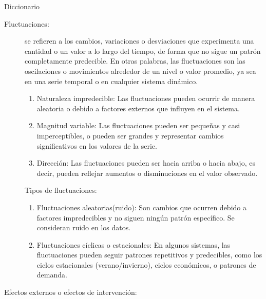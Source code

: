 \newpage
Diccionario
\begin{description}
    \item[Fluctuaciones: ] se refieren a los cambios, variaciones o desviaciones que experimenta 
    una cantidad o un valor a lo largo del tiempo, de forma que no sigue un patr\'on 
    completamente predecible. 
    En otras palabras, las fluctuaciones son las oscilaciones o movimientos alrededor de un 
    nivel o valor promedio, ya sea en una serie temporal o en cualquier sistema din\'amico.
    \begin{enumerate}
        \item Naturaleza impredecible: Las fluctuaciones pueden ocurrir de manera aleatoria o debido a factores externos que influyen en el sistema.
        \item Magnitud variable: Las fluctuaciones pueden ser peque\~nas y casi imperceptibles, o pueden ser grandes y representar cambios significativos en los valores de la serie.
        \item Direcci\'on: Las fluctuaciones pueden ser hacia arriba o hacia abajo, es decir, pueden reflejar aumentos o disminuciones en el valor observado.
    \end{enumerate}
    Tipos de fluctuaciones: 
    \begin{enumerate}
        \item Fluctuaciones aleatorias(ruido): Son cambios que ocurren debido a factores impredecibles y no siguen ning\'un patr\'on espec\'ifico. Se consideran ruido en los datos.
        \item Fluctuaciones c\'iclicas o estacionales: En algunos sistemas, las fluctuaciones pueden seguir patrones repetitivos y predecibles, como los ciclos estacionales (verano/invierno), ciclos econ\'omicos, o patrones de demanda.
    \end{enumerate}
    \item[Efectos externos o efectos de intervenci\'on: ] 
\end{description}
